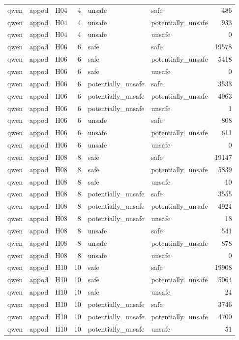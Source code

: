 \begin{table}[tbp]
\begin{tabular}{lllrllr}
qwen & appod & H04 & 4 & unsafe & safe & 486 \\
qwen & appod & H04 & 4 & unsafe & potentially\_unsafe & 933 \\
qwen & appod & H04 & 4 & unsafe & unsafe & 0 \\
qwen & appod & H06 & 6 & safe & safe & 19578 \\
qwen & appod & H06 & 6 & safe & potentially\_unsafe & 5418 \\
qwen & appod & H06 & 6 & safe & unsafe & 0 \\
qwen & appod & H06 & 6 & potentially\_unsafe & safe & 3533 \\
qwen & appod & H06 & 6 & potentially\_unsafe & potentially\_unsafe & 4963 \\
qwen & appod & H06 & 6 & potentially\_unsafe & unsafe & 1 \\
qwen & appod & H06 & 6 & unsafe & safe & 808 \\
qwen & appod & H06 & 6 & unsafe & potentially\_unsafe & 611 \\
qwen & appod & H06 & 6 & unsafe & unsafe & 0 \\
qwen & appod & H08 & 8 & safe & safe & 19147 \\
qwen & appod & H08 & 8 & safe & potentially\_unsafe & 5839 \\
qwen & appod & H08 & 8 & safe & unsafe & 10 \\
qwen & appod & H08 & 8 & potentially\_unsafe & safe & 3555 \\
qwen & appod & H08 & 8 & potentially\_unsafe & potentially\_unsafe & 4924 \\
qwen & appod & H08 & 8 & potentially\_unsafe & unsafe & 18 \\
qwen & appod & H08 & 8 & unsafe & safe & 541 \\
qwen & appod & H08 & 8 & unsafe & potentially\_unsafe & 878 \\
qwen & appod & H08 & 8 & unsafe & unsafe & 0 \\
qwen & appod & H10 & 10 & safe & safe & 19908 \\
qwen & appod & H10 & 10 & safe & potentially\_unsafe & 5064 \\
qwen & appod & H10 & 10 & safe & unsafe & 24 \\
qwen & appod & H10 & 10 & potentially\_unsafe & safe & 3746 \\
qwen & appod & H10 & 10 & potentially\_unsafe & potentially\_unsafe & 4700 \\
qwen & appod & H10 & 10 & potentially\_unsafe & unsafe & 51 \\

\end{tabular}
\end{table}
